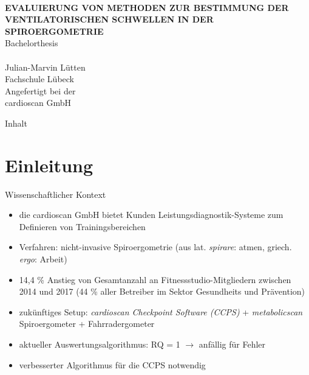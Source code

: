 \documentclass[colorBG,slideColor,9pt]{beamer}
\newcommand{\talktitle}{Evaluierung von Methoden zur Bestimmung der ventilatorischen Schwellen in der Spiroergometrie}
\begin{document}
\begin{frame}
    \vspace{-10ex}
    \textcolor{fhlred}{\HRuleFill[0.4ex]} \\ \vspace{1ex}
    {\linespread{1.5}\selectfont
    \MakeUppercase{\bf \huge \talktitle}\\[5.5ex]}
    \normalsize Bachelorthesis\\
    \textcolor{fhlred}{\HRuleFill[0.1ex]} \\ \vspace{4ex}
    \small Julian-Marvin Lütten\\
    \small Fachschule Lübeck\\
    \vspace{2ex}
    \small Angefertigt bei der\\
    \small cardioscan GmbH
\end{frame}

\begin{frame}{Inhalt}
\tableofcontents
\end{frame}

\section{Einleitung}

\begin{frame}{Wissenschaftlicher Kontext}
\begin{itemize}
	\item die cardioscan GmbH bietet Kunden Leistungsdiagnostik-Systeme zum Definieren von Trainingsbereichen 
	\item Verfahren: nicht-invasive Spiroergometrie (aus lat. \textsl{spirare}: atmen, griech. \textsl{ergo}: Arbeit)
	\item 14,4 \% Anstieg von Gesamtanzahl an Fitnessstudio-Mitgliedern zwischen 2014 und 2017 (44 \% aller Betreiber im Sektor Gesundheits und Prävention)
	\item zukünftiges Setup: \textsl{cardioscan Checkpoint Software (CCPS)} + \textsl{metabolicscan} Spiroergometer + Fahrradergometer
	\item aktueller Auswertungsalgorithmus: RQ = 1 $\rightarrow$ anfällig für Fehler
	\item verbesserter Algorithmus für die CCPS notwendig
\end{itemize}
\end{frame}
\end{document}
